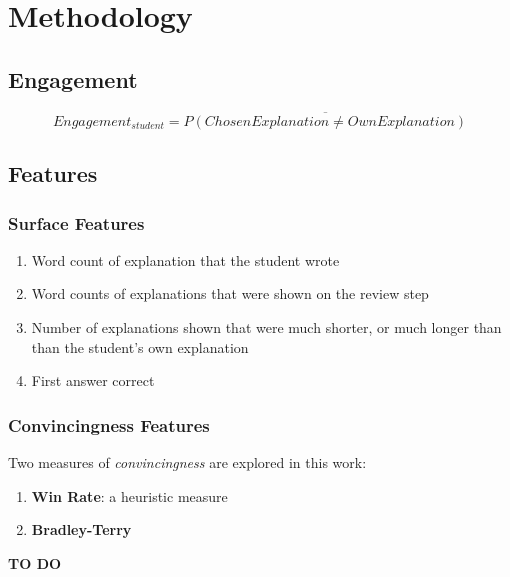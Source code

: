 \documentclass[sigconf]{acmart}
\begin{document}
\section{Methodology}



\subsection{Engagement}


\begin{equation}
Engagement_{student} = 
\overline{P(ChosenExplanation \ne 
	OwnExplanation)} 
\label{eq:engagement_choose_peer}
\end{equation}



\subsection{Features}


\subsubsection{Surface Features}

	\begin{enumerate}
	\item Word count of explanation that the student wrote 
	\item Word counts of explanations that were shown on the review step
	\item Number of explanations shown that were much shorter, or much longer 
	than than the student's own explanation 
	\item First answer correct
	\end{enumerate}


\subsubsection{Convincingness Features}
Two measures of \textit{convincingness} are explored in this work:
\begin{enumerate}
	\item \textbf{Win Rate}: a heuristic measure \cite{potash_ranking_2019}
	\item \textbf{Bradley-Terry}
\end{enumerate}


\begin{acks}
\textbf{TO DO}
\end{acks}



\end{document}
